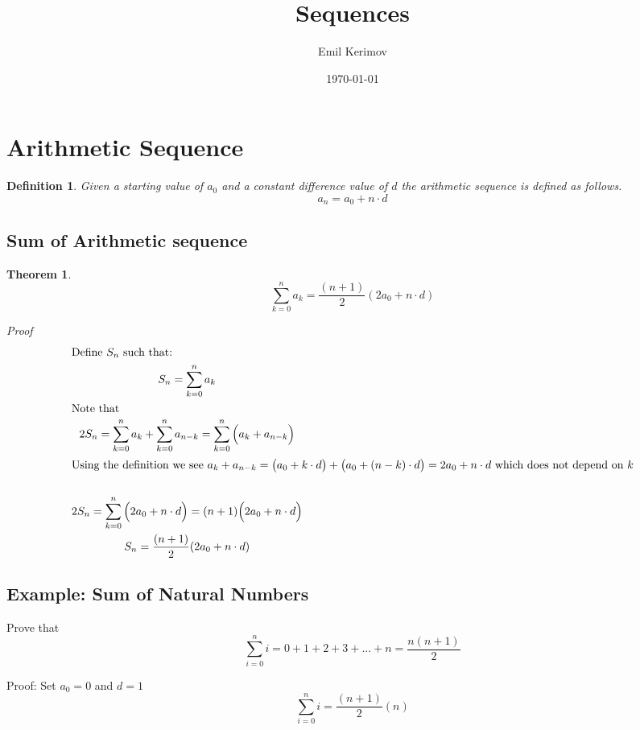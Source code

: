 \documentclass[a4paper]{article}
\title{Sequences}
\author{Emil Kerimov}
\date{\today}
\begin{document}
\maketitle

\newtheorem{theorem}{Theorem}[section]
\newtheorem{definition}{Definition}[section]

\section{Arithmetic Sequence}

\begin{definition}\label{Arithmetic def}
Given a starting value of $a_0$ and a constant difference value of $d$ the arithmetic sequence is defined as follows.
$$\boxed{
a_n = a_0 + n \cdot d
}
$$
\end{definition}

\subsection{Sum of Arithmetic sequence}\label{Sum of Arithmetic sequence}


\begin{theorem}
\begin{equation} \label{Sum of Arithmetic sequence}
\sum\limits_{k=0}^{n} a_k = \frac{(n+1)}{2} ( 2 a_0 +n \cdot d )
\end{equation}

Proof
\begin{gather*}
\intertext{Define $S_n$ such that:}
S_{n} = \sum_{k=0}^{n} a_k 
\\
\intertext{Note that}
2 S_{n} = \sum_{k=0}^{n} a_k + \sum_{k=0}^{n} a_{n-k} = \sum_{k=0}^{n} \Big( a_k + a_{n-k} \Big)
\\
\intertext{Using the definition we see $a_k + a_{n-k} = \big( a_0 + k \cdot d \big) + \big( a_0 + (n-k) \cdot d \big) =  2 a_0 +n \cdot d $ which does not depend on $k$}
\\
2 S_{n} = \sum_{k=0}^{n} \Big( 2 a_0 +n \cdot d \Big) = (n+1) \Big( 2 a_0 +n \cdot d \Big)
\\
S_{n} = \frac{(n+1)}{2} ( 2 a_0 +n \cdot d )
\end{gather*}
\end{theorem}

\subsection{Example: Sum of Natural Numbers}\label{Sum of Natural Numbers}
Prove that $$\sum\limits_{i=0}^{n} i = 0+ 1+2+3+...+n = \frac{n(n+1)}{2}$$

Proof:
Set $a_0 = 0$ and $d=1$
$$\sum\limits_{i=0}^{n} i
=
\frac{(n+1)}{2} (n )$$
\end{document}
